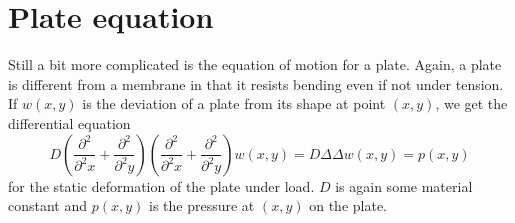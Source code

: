 %
%
%
\section{Plate equation}
Still a bit more complicated is the equation of motion for a plate.
Again, a plate is different from a membrane in that it resists bending
even if not under tension.
If $w(x,y)$ is the deviation of a plate from its shape at point $(x,y)$,
we get the differential equation
\[
D\left(
\frac{\partial^2}{\partial^2 x}
+
\frac{\partial^2}{\partial^2 y}
\right)
\left(
\frac{\partial^2}{\partial^2 x}
+
\frac{\partial^2}{\partial^2 y}
\right)
w(x,y)
=D\Delta\Delta w(x,y)
=p(x,y)
\]
for the static deformation of the plate under load.
$D$ is again some material constant and $p(x,y)$ is the pressure at
$(x,y)$ on the plate.

